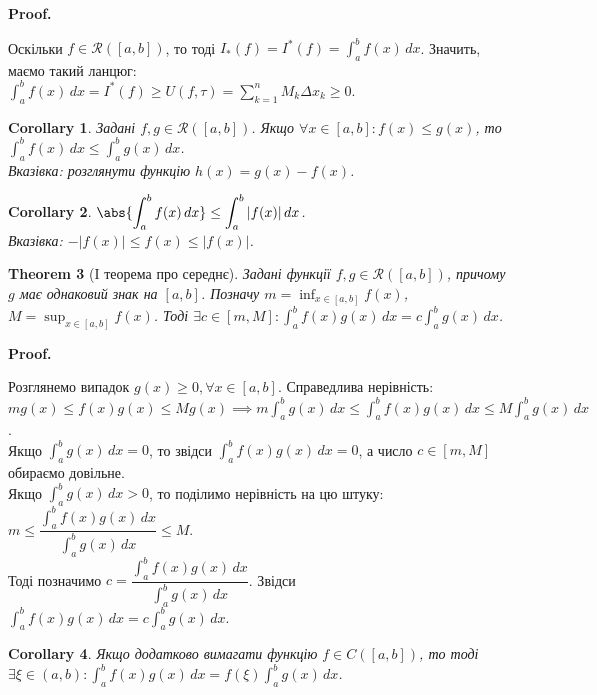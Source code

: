 \documentclass[a4paper, 10pt]{article}
\makeatletter
\def\huge{\displaystyle}
\def\qed{$\blacksquare$}
\theoremstyle{theoremdd}
\newtheorem{theorem}{Theorem}[subsection]
\theoremstyle{theoremdd}
\theoremstyle{theoremdd}
\theoremstyle{theoremdd}
\theoremstyle{theoremdd}
\theoremstyle{theoremdd}
\theoremstyle{theoremdd}
\theoremstyle{theoremdd}
\theoremstyle{theoremdd}
\newtheorem{corollary}[theorem]{Corollary}
\renewenvironment{proof}[1][Proof.\\]{\par
\pushQED{\hfill \qed}%
\normalfont \topsep6\p@\@plus6\p@\relax
\trivlist
\item\relax
{\bfseries
#1\@addpunct{.}}\hspace\labelsep\ignorespaces
}{%
\popQED\endtrivlist\@endpefalse
}
\makeatother
\begin{document}
\begin{proof}
Оскільки $f \in \mathcal{R}([a,b])$, то тоді $I_*(f) = I^*(f) = \huge\int_a^b f(x) \,dx$. Значить, маємо такий ланцюг:\\
$\huge\int_a^b f(x)\,dx = I^*(f) \geq U(f, \tau) = \huge\sum_{k=1}^n M_k \Delta x_k \geq 0$.
\end{proof}

\begin{corollary}
Задані $f,g \in \mathcal{R}([a,b])$. Якщо $\forall x \in [a,b]: f(x) \leq g(x)$, то $\huge\int_a^b f(x)\,dx \leq \int_a^b g(x)\,dx$.\\
\textit{Вказівка: розглянути функцію $h(x) = g(x) - f(x)$.}
\end{corollary}

\begin{corollary}
$\huge \abs{\int_a^b f(x)\,dx} \leq \int_a^b |f(x)|\,dx$.\\
\textit{Вказівка: $-|f(x)| \leq f(x) \leq |f(x)|$.}
\end{corollary}

\begin{theorem}[I теорема про середнє]
Задані функції $f,g \in \mathcal{R}([a,b])$, причому $g$ має однаковий знак на $[a,b]$. Позначу $m = \huge \inf_{x \in [a,b]}f(x)$, $M = \huge \sup_{x \in [a,b]}f(x)$. Тоді $\exists c \in \huge [m,M]: \int_a^b f(x)g(x)\,dx = c \int_a^b g(x)\,dx$.
\end{theorem}

\begin{proof}
Розглянемо випадок $g(x) \geq 0, \forall x \in [a,b]$. Справедлива нерівність:\\
$mg(x) \leq f(x)g(x) \leq M g(x) \implies \huge m\int_a^b g(x)\,dx \leq \int_a^b f(x)g(x)\,dx \leq M \int_a^b g(x)\,dx$.\\
Якщо $\huge\int_a^b g(x)\,dx = 0$, то звідси $\huge\int_a^b f(x)g(x)\,dx = 0$, а число $c \in [m,M]$ обираємо довільне.
\bigskip \\
Якщо $\huge\int_a^b g(x)\,dx > 0$, то поділимо нерівність на цю штуку:\\
$m \leq \dfrac{\huge\int_a^b f(x)g(x)\,dx}{\huge\int_a^b g(x)\,dx} \leq M$. \\
Тоді позначимо $c = \dfrac{\huge\int_a^b f(x)g(x)\,dx}{\huge\int_a^b g(x)\,dx}$. Звідси $\huge\int_a^b f(x)g(x)\,dx = c \int_a^b g(x)\,dx$.
\end{proof}

\begin{corollary}
Якщо додатково вимагати функцію $f \in C([a,b])$, то тоді \\ $\exists \xi \in (a,b): \huge\int_a^b f(x)g(x)\,dx = f(\xi) \int_a^b g(x)\,dx$.
\end{corollary}
\end{document}
